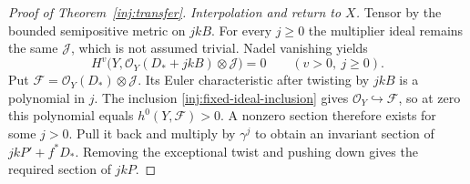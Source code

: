 \begin{proof}[Proof of Theorem~\ref{inj:transfer}]
\smallskip\noindent\textit{Interpolation and return to $X$.} Tensor by the bounded semipositive metric on $jkB$.  For every
$j\ge0$ the multiplier ideal remains the same $\mathcal J$,
which is not assumed trivial.  Nadel vanishing yields
\[
 H^v\bigl(Y,\mathcal O_Y(D_*+jkB)\otimes\mathcal J\bigr)=0
 \qquad(v>0,\ j\ge0).
\]
Put $\mathcal F=\mathcal O_Y(D_*)\otimes\mathcal J$.
Its Euler characteristic after twisting by $jkB$ is a polynomial in
$j$. The inclusion \eqref{inj:fixed-ideal-inclusion} gives
$\mathcal O_Y\hookrightarrow\mathcal F$, so at zero this polynomial
equals $h^0(Y,\mathcal F)>0$. A nonzero section therefore exists for
some $j>0$. Pull it back
and multiply by $\gamma^j$ to obtain an invariant section of
$jkP'+f^*D_*$.  Removing the exceptional twist and pushing down
gives the required section of $jkP$.
\end{proof}
